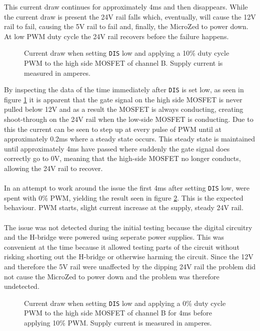 This current draw continues for approximately 4ms and then disappears.
While the current draw is present the 24V rail falls which, eventually, will cause the 12V rail to fail, causing the 5V rail to fail and, finally, the MicroZed to power down.
At low PWM duty cycle the 24V rail recovers before the failure happens.

\begin{figure}[h]
	\centering
	
	\caption{Current draw when setting \texttt{DIS} low and applying a 10\% duty cycle PWM to the high side MOSFET of channel B. Supply current is measured in amperes.}
	\label{fig:current_w_load_closeup}
\end{figure}

By inspecting the data of the time immediately after \texttt{DIS} is set low, as seen in figure \ref{fig:current_w_load_closeup} it is apparent that the gate signal on the high side MOSFET is never pulled below 12V and as a result the MOSFET is always conducting, creating shoot-through on the 24V rail when the low-side MOSFET is conducting.
Due to this the current can be seen to step up at every pulse of PWM until at approximately 0.2ms where a steady state occurs.
This steady state is maintained until approximately 4ms have passed where suddenly the gate signal does correctly go to 0V, meaning that the high-side MOSFET no longer conducts, allowing the 24V rail to recover.
\\~\\
In an attempt to work around the issue the first 4ms after setting \texttt{DIS} low, were spent with 0\% PWM, yielding the result seen in figure \ref{fig:current_w_load_slow}.
This is the expected behaviour.
PWM starts, slight current increase at the supply, steady 24V rail.
\\~\\
The issue was not detected during the initial testing because the digital circuitry and the H-bridge were powered using seperate power supplies.
This was convenient at the time because it allowed testing parts of the circuit without risking shorting out the H-bridge or otherwise harming the circuit.
Since the 12V and therefore the 5V rail were unaffected by the dipping 24V rail the problem did not cause the MicroZed to power down and the problem was therefore undetected. 

\begin{figure}[h]
	\centering
%	
	\caption{Current draw when setting \texttt{DIS} low and applying a 0\% duty cycle PWM to the high side MOSFET of channel B for 4ms before applying 10\% PWM. Supply current is measured in amperes.}
	\label{fig:current_w_load_slow}
\end{figure}

